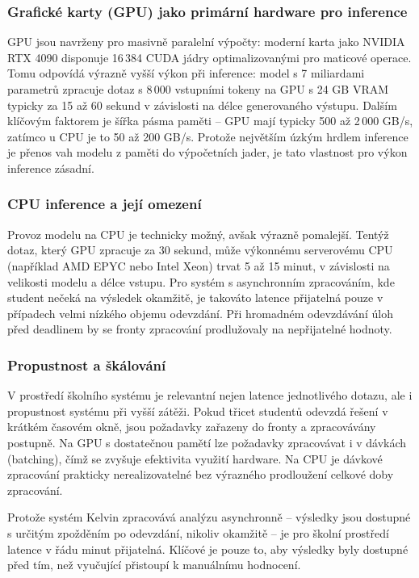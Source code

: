 \subsubsection*{Grafické karty (GPU) jako primární hardware pro inference}

GPU jsou navrženy pro masivně paralelní výpočty: moderní karta jako NVIDIA RTX 4090 disponuje 16\,384 CUDA jádry optimalizovanými pro maticové operace.
Tomu odpovídá výrazně vyšší výkon při inference: model s 7 miliardami parametrů zpracuje dotaz s 8\,000 vstupními tokeny na GPU s 24 GB VRAM typicky za 15 až 60 sekund v závislosti na délce generovaného výstupu.
Dalším klíčovým faktorem je šířka pásma paměti -- GPU mají typicky 500 až 2\,000 GB/s, zatímco u CPU je to 50 až 200 GB/s.
Protože největším úzkým hrdlem inference je přenos vah modelu z paměti do výpočetních jader, je tato vlastnost pro výkon inference zásadní.

\subsubsection*{CPU inference a její omezení}

Provoz modelu na CPU je technicky možný, avšak výrazně pomalejší.
Tentýž dotaz, který GPU zpracuje za 30 sekund, může výkonnému serverovému CPU (například AMD EPYC nebo Intel Xeon) trvat 5 až 15 minut, v závislosti na velikosti modelu a délce vstupu.
Pro systém s asynchronním zpracováním, kde student nečeká na výsledek okamžitě, je takováto latence přijatelná pouze v případech velmi nízkého objemu odevzdání.
Při hromadném odevzdávání úloh před deadlinem by se fronty zpracování prodlužovaly na nepřijatelné hodnoty.

\subsubsection*{Propustnost a škálování}

V prostředí školního systému je relevantní nejen latence jednotlivého dotazu, ale i propustnost systému při vyšší zátěži.
Pokud třicet studentů odevzdá řešení v krátkém časovém okně, jsou požadavky zařazeny do fronty a zpracovávány postupně.
Na GPU s dostatečnou pamětí lze požadavky zpracovávat i v dávkách (batching), čímž se zvyšuje efektivita využití hardware.
Na CPU je dávkové zpracování prakticky nerealizovatelné bez výrazného prodloužení celkové doby zpracování.

Protože systém Kelvin zpracovává analýzu asynchronně -- výsledky jsou dostupné s určitým zpožděním po odevzdání, nikoliv okamžitě -- je pro školní prostředí latence v řádu minut přijatelná.
Klíčové je pouze to, aby výsledky byly dostupné před tím, než vyučující přistoupí k manuálnímu hodnocení.


